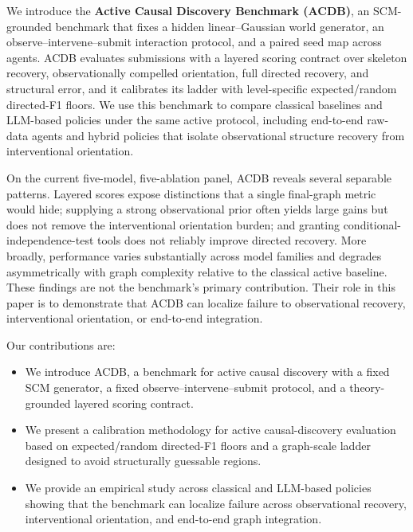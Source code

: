 We introduce the \textbf{Active Causal Discovery Benchmark (ACDB)}, an SCM-grounded benchmark that fixes a hidden linear--Gaussian world generator, an observe--intervene--submit interaction protocol, and a paired seed map across agents. ACDB evaluates submissions with a layered scoring contract over skeleton recovery, observationally compelled orientation, full directed recovery, and structural error, and it calibrates its ladder with level-specific expected/random directed-F1 floors. We use this benchmark to compare classical baselines and LLM-based policies under the same active protocol, including end-to-end raw-data agents and hybrid policies that isolate observational structure recovery from interventional orientation.

On the current five-model, five-ablation panel, ACDB reveals several separable patterns. Layered scores expose distinctions that a single final-graph metric would hide; supplying a strong observational prior often yields large gains but does not remove the interventional orientation burden; and granting conditional-independence-test tools does not reliably improve directed recovery. More broadly, performance varies substantially across model families and degrades asymmetrically with graph complexity relative to the classical active baseline. These findings are not the benchmark's primary contribution. Their role in this paper is to demonstrate that ACDB can localize failure to observational recovery, interventional orientation, or end-to-end integration.

Our contributions are:
\begin{itemize}
    \item We introduce ACDB, a benchmark for active causal discovery with a fixed SCM generator, a fixed observe--intervene--submit protocol, and a theory-grounded layered scoring contract.
    \item We present a calibration methodology for active causal-discovery evaluation based on expected/random directed-F1 floors and a graph-scale ladder designed to avoid structurally guessable regions.
    \item We provide an empirical study across classical and LLM-based policies showing that the benchmark can localize failure across observational recovery, interventional orientation, and end-to-end graph integration.
\end{itemize}
